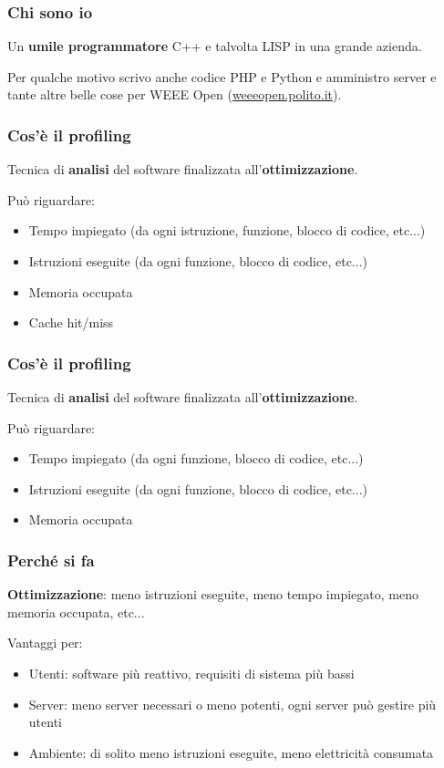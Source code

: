 \documentclass[aspectratio=169]{beamer}
\title{\mytitle}
\author{Ludovico Pavesi}
\date{2020-10-24}
\begin{document}
	
	\frame{\titlepage}
		
	\begin{frame}
		\frametitle{Chi sono io}
		Un \textbf{umile programmatore} C++ e talvolta LISP in una grande azienda.
		
		Per qualche motivo scrivo anche codice PHP e Python e amministro server e tante altre belle cose per WEEE Open (\href{http://weeeopen.polito.it}{weeeopen.polito.it}).
	\end{frame}

	\begin{frame}
		\frametitle{Cos'è il profiling}
		Tecnica di \textbf{analisi} del software finalizzata all'\textbf{ottimizzazione}.
		
		Può riguardare:
		\begin{itemize}
			\item Tempo impiegato (da ogni istruzione, funzione, blocco di codice, etc...)
			\item Istruzioni eseguite (da ogni funzione, blocco di codice, etc...)
			\item Memoria occupata
			\item Cache hit/miss
		\end{itemize}
	\end{frame}

	\begin{frame}
		\frametitle{Cos'è il profiling}
		Tecnica di \textbf{analisi} del software finalizzata all'\textbf{ottimizzazione}.
		
		Può riguardare:
		\begin{itemize}
			\item Tempo impiegato (da ogni funzione, blocco di codice, etc...)
			\item Istruzioni eseguite (da ogni funzione, blocco di codice, etc...)
			\item Memoria occupata
		\end{itemize}
	\end{frame}

\begin{frame}
	\frametitle{Perché si fa}
	\textbf{Ottimizzazione}: meno istruzioni eseguite, meno tempo impiegato, meno memoria occupata, etc...
	
	Vantaggi per:
	\begin{itemize}
		\item Utenti: software più reattivo, requisiti di sistema più bassi
		\item Server: meno server necessari o meno potenti, ogni server può gestire più utenti
		\item Ambiente: di solito meno istruzioni eseguite, meno elettricità consumata
	\end{itemize}
\end{frame}
\end{document}
